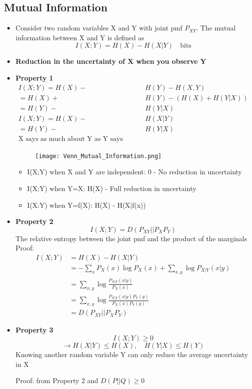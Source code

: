 \documentclass[12pt]{article}
\begin{document}
\subsection{Mutual Information}
\begin{itemize}
    \item Consider two random variables X and Y with joint pmf $P_{XY}$. The mutual information between X and Y is defined as 
    \[
    I(X;Y) = H(X) - H(X|Y) \quad \textrm{bits}
    \]
    \item \textbf{Reduction in the uncertainty of X when you observe Y}
    \item \textbf{Property 1}
    \begin{align*}
        I(X;Y) = H(X) - &H(Y) - H(X,Y)\\
               = H(X) + &H(Y) - (H(X)+H(Y|X))\\
               = H(Y) - &H(Y|X)\\
        I(X;Y) = H(X) - &H(X|Y)\\
               = H(Y) - &H(Y|X)\\
         \textrm{X says as much about Y as Y says about X}
    \end{align*}
    \begin{figure}[h]
        \centering
        \texttt{[image: Venn\_Mutual\_Information.png]}
        \label{fig:Venn_Mutual}
    \end{figure}
    \begin{itemize}
        \item I(X;Y) when X and Y are independent: 0 - No reduction in uncertainty
        \item I(X;Y) when Y=X: H(X) - Full reduction in uncertainty
        \item I(X:Y) when Y=f(X): H(X) - H(X|f(x)) 
    \end{itemize}
    \item \textbf{Property 2}
    \[
    I(X;Y) = D(P_{XY}||P_X P_Y)
    \]
    The relative entropy between the joint pmf and the product of the marginals \\
    Proof:
    \begin{align*}
        I(X;Y) &= H(X) - H(X|Y) \\
        &= -\sum_x P_X(x) \log P_X(x) + \sum_{x,y} \log P_{X|Y}(x|y) \\
        &= \sum_{x,y} \log \frac{P_{X|Y}(x|y)}{P_X(x)} \\
        &= \sum_{x,y} \log \frac{P_{X|Y}(x|y)P_Y(y)}{P_X(x)P_Y(y)} \\
        &= D( P_{XY} || P_X P_Y)
    \end{align*}
    
    \item \textbf{Property 3}
    \[
    I(X;Y) \ge 0
    \]
    \[
    \rightarrow H(X|Y) \le H(X), \quad H(Y|X) \le H(Y) 
    \]
    Knowing another random variable Y can only reduce the average uncertainty in X
    
    Proof: from Property 2 and $D(P||Q) \ge 0$ 
    \end{itemize}
\end{document}
